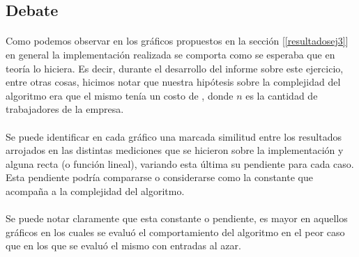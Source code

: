 \subsection{Debate}
\paragraph{}
Como podemos observar en los gráficos propuestos en la sección [\ref{resultadosej3}] en general la implementación realizada se comporta como se esperaba que en teoría lo hiciera. Es decir, durante el desarrollo del informe sobre este ejercicio, entre otras cosas, hicimos notar que nuestra hipótesis sobre la complejidad del algoritmo era que el mismo tenía un costo de , donde $n$ es la cantidad de trabajadores de la empresa.

\paragraph{}
Se puede identificar en cada gráfico una marcada similitud entre los resultados arrojados en las distintas mediciones que se hicieron sobre la implementación y alguna recta (o función lineal), variando esta última su pendiente para cada caso. Esta pendiente podría compararse o considerarse como la constante que acompa\~na a la complejidad del algoritmo.

\paragraph{}
Se puede notar claramente que esta constante o pendiente, es mayor en aquellos gráficos en los cuales se evaluó el comportamiento del algoritmo en el peor caso que en los que se evaluó el mismo con entradas al azar.


